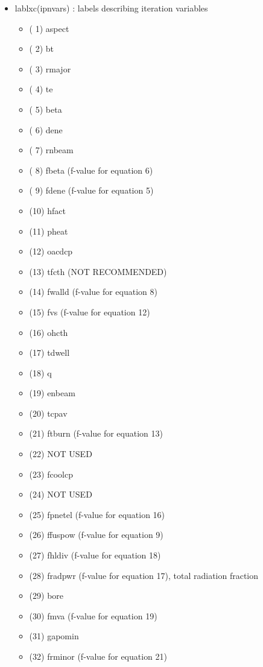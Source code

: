 \documentclass[]{article}
\providecommand{\tightlist}{%
  \setlength{\itemsep}{0pt}\setlength{\parskip}{0pt}}
\begin{document}
\begin{itemize}
\tightlist
\item
  lablxc(ipnvars) : labels describing iteration variables

  \begin{itemize}
  \tightlist
  \item
    ( 1) aspect
  \item
    ( 2) bt
  \item
    ( 3) rmajor
  \item
    ( 4) te
  \item
    ( 5) beta
  \item
    ( 6) dene
  \item
    ( 7) rnbeam
  \item
    ( 8) fbeta (f-value for equation 6)
  \item
    ( 9) fdene (f-value for equation 5)
  \item
    (10) hfact
  \item
    (11) pheat
  \item
    (12) oacdcp
  \item
    (13) tfcth (NOT RECOMMENDED)
  \item
    (14) fwalld (f-value for equation 8)
  \item
    (15) fvs (f-value for equation 12)
  \item
    (16) ohcth
  \item
    (17) tdwell
  \item
    (18) q
  \item
    (19) enbeam
  \item
    (20) tcpav
  \item
    (21) ftburn (f-value for equation 13)
  \item
    (22) NOT USED
  \item
    (23) fcoolcp
  \item
    (24) NOT USED
  \item
    (25) fpnetel (f-value for equation 16)
  \item
    (26) ffuspow (f-value for equation 9)
  \item
    (27) fhldiv (f-value for equation 18)
  \item
    (28) fradpwr (f-value for equation 17), total radiation fraction
  \item
    (29) bore
  \item
    (30) fmva (f-value for equation 19)
  \item
    (31) gapomin
  \item
    (32) frminor (f-value for equation 21)

\end{itemize}
\end{itemize}
\end{document}
